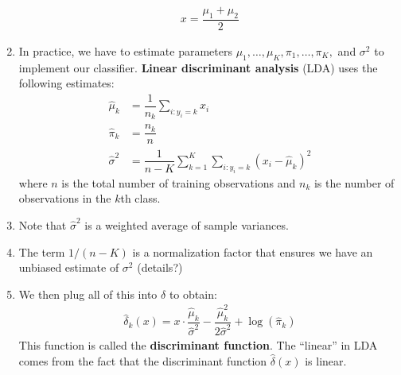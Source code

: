 \documentclass[10pt]{article}
\begin{document}
\begin{enumerate}
	\begin{align*}
		x = \dfrac{\mu_1 + \mu_2}{2} 
	\end{align*}
	\item In practice, we have to estimate parameters $\mu_1, \dots, \mu_K, \pi_1, \dots, \pi_K,$ and $\sigma^2$ to implement our classifier.  \textbf{Linear discriminant analysis} (LDA) uses the following estimates:
	\begin{align*}
		\hat \mu_k &= \dfrac{1}{n_k} \sum_{i: y_i = k} x_i \\
		\hat \pi_k &= \dfrac{n_k}{n} \\ 
		\hat \sigma^2 &= \dfrac{1}{n - K} \sum_{k = 1}^K \sum_{i:y_i = k} (x_i - \hat \mu_k)^2 
	\end{align*}
	where $n$ is the total number of training observations and $n_k$ is the number of observations in the $k$th class.  
	\item Note that $\hat \sigma^2$ is a weighted average of sample variances.
	\item The term $1/(n - K)$ is a normalization factor that ensures we have an unbiased estimate of $\sigma^2$ (details?) 
	\item We then plug all of this into $\delta$ to obtain: 
	\begin{align*}
		\hat \delta_k(x) = x \cdot \dfrac{\hat \mu_k}{\hat \sigma^2} - \dfrac{\hat \mu_k^2}{2\hat \sigma^2} + \log(\hat \pi_k)
	\end{align*}
	This function is called the \textbf{discriminant function}.  The ``linear'' in LDA comes from the fact that the discriminant function $\hat \delta(x)$ is linear.  
\end{enumerate}

\vspace{.2in} 
\end{document}
